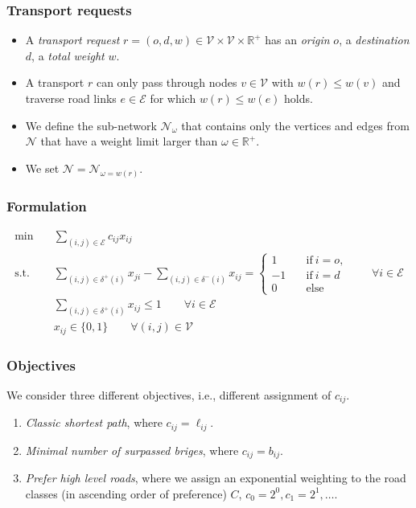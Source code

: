 \documentclass{beamer}   %
\theoremstyle{break}
\begin{document}
  \begin{frame}
    \frametitle{Transport requests}

    \begin{itemize}
      \item
      A \emph{transport request} $r=(o,d,w) \in \mathcal{V} \times \mathcal{V} \times \mathbb{R}^{+}$
      has an \emph{origin} $o$, a \emph{destination} $d$, a \emph{total weight} $w$.

      \item A transport $r$ can only pass through nodes $v \in \mathcal{V}$ with
      $w(r) \leq w(v)$ and traverse road links $e \in \mathcal{E}$ for which $w(r) \leq w(e)$ holds.

      \item We define the sub-network $\mathcal{N}_{\omega}$ that contains only the vertices and edges from $\mathcal{N}$ that have a weight limit larger than $\omega \in \mathbb{R}^{+}$.

      \item We set $\mathcal{N}=\mathcal{N}_{\omega=w(r)}$.
    \end{itemize}

  \end{frame}



  \begin{frame}
    \frametitle{Formulation}
    \begin{align}
      \min \quad &\sum_{(i,j)\in \mathcal{E}}  c_{ij} x_{ij} \label{obj} \\
      \text{s.t.}\quad &
      \sum_{(i,j)\in \delta^{+} (i)} x_{ji} - \sum_{(i,j)\in \delta^{-}(i)} x_{ij} =
      \begin{cases}
        1 \quad& \text{if}~ i=o, \\
        -1 \quad& \text{if}~ i=d \\
        0 \quad&\text{else}
      \end{cases}
      \qquad \forall i \in \mathcal{E}
      \\
      &  \sum_{(i,j)\in \delta^{+} (i)} x_ {ij} \leq 1     \qquad \forall i \in \mathcal{E}\\
      &  x_{ij} \in \{0,1\}   \qquad \forall (i,j) \in \mathcal{V}
    \end{align}
  \end{frame}


  \begin{frame}
    \frametitle{Objectives}
    We consider three different objectives, i.e., different assignment of $c_{ij}$.
    \begin{enumerate}
      \item \emph{Classic shortest path}, where $c_{ij}=\ell_{ij}$. \label{obj_short}
      \item \emph{Minimal number of surpassed briges}, where  $c_{ij}=b_{ij}$.  \label{obj_minBridge}
      \item \emph{Prefer high level roads}, where we assign an exponential weighting to the road classes (in ascending order of preference) $C$, $c_0=2^0,c_1=2^1, \ldots$.  \label{obj_highLevelRoad}
    \end{enumerate}
  \end{frame}
\end{document}
